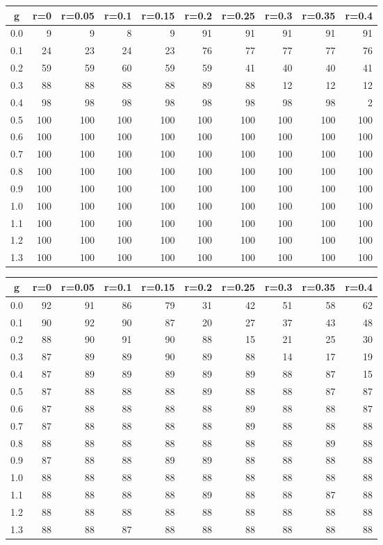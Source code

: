 %
\begin{table}[!tbp]
 \begin{center}
 \begin{tabular}{rrrrrrrrrr}\hline\hline
\multicolumn{1}{c}{g}&\multicolumn{1}{c}{r=0}&\multicolumn{1}{c}{r=0.05}&\multicolumn{1}{c}{r=0.1}&\multicolumn{1}{c}{r=0.15}&\multicolumn{1}{c}{r=0.2}&\multicolumn{1}{c}{r=0.25}&\multicolumn{1}{c}{r=0.3}&\multicolumn{1}{c}{r=0.35}&\multicolumn{1}{c}{r=0.4}\tabularnewline
\hline
0.0&  9&  9&  8&  9& 91& 91& 91& 91& 91\tabularnewline
0.1& 24& 23& 24& 23& 76& 77& 77& 77& 76\tabularnewline
0.2& 59& 59& 60& 59& 59& 41& 40& 40& 41\tabularnewline
0.3& 88& 88& 88& 88& 89& 88& 12& 12& 12\tabularnewline
0.4& 98& 98& 98& 98& 98& 98& 98& 98&  2\tabularnewline
0.5&100&100&100&100&100&100&100&100&100\tabularnewline
0.6&100&100&100&100&100&100&100&100&100\tabularnewline
0.7&100&100&100&100&100&100&100&100&100\tabularnewline
0.8&100&100&100&100&100&100&100&100&100\tabularnewline
0.9&100&100&100&100&100&100&100&100&100\tabularnewline
1.0&100&100&100&100&100&100&100&100&100\tabularnewline
1.1&100&100&100&100&100&100&100&100&100\tabularnewline
1.2&100&100&100&100&100&100&100&100&100\tabularnewline
1.3&100&100&100&100&100&100&100&100&100\tabularnewline
\hline
\end{tabular}

\end{center}

\end{table}

%
\begin{table}[!tbp]
 \begin{center}
 \begin{tabular}{rrrrrrrrrr}\hline\hline
\multicolumn{1}{c}{g}&\multicolumn{1}{c}{r=0}&\multicolumn{1}{c}{r=0.05}&\multicolumn{1}{c}{r=0.1}&\multicolumn{1}{c}{r=0.15}&\multicolumn{1}{c}{r=0.2}&\multicolumn{1}{c}{r=0.25}&\multicolumn{1}{c}{r=0.3}&\multicolumn{1}{c}{r=0.35}&\multicolumn{1}{c}{r=0.4}\tabularnewline
\hline
0.0&92&91&86&79&31&42&51&58&62\tabularnewline
0.1&90&92&90&87&20&27&37&43&48\tabularnewline
0.2&88&90&91&90&88&15&21&25&30\tabularnewline
0.3&87&89&89&90&89&88&14&17&19\tabularnewline
0.4&87&89&89&89&89&89&88&87&15\tabularnewline
0.5&87&88&88&88&89&88&88&87&87\tabularnewline
0.6&87&88&88&88&88&89&88&88&87\tabularnewline
0.7&87&88&88&88&88&89&88&88&88\tabularnewline
0.8&88&88&88&88&88&88&88&89&88\tabularnewline
0.9&87&88&88&89&89&88&88&88&88\tabularnewline
1.0&88&88&88&88&88&88&88&88&88\tabularnewline
1.1&88&88&88&88&89&88&88&87&88\tabularnewline
1.2&88&88&88&88&88&88&88&88&88\tabularnewline
1.3&88&88&87&88&88&88&88&88&88\tabularnewline
\hline
\end{tabular}

\end{center}

\end{table}

